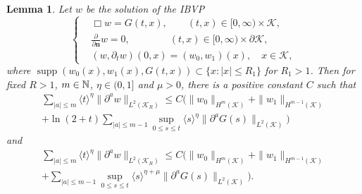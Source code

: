 \documentclass[11pt,twoside]{article}
\def\cK{\mathcal K}
\def\N{\mathop{\mathbb N\kern 0pt}\nolimits}
\def\supp{\mathop{\rm supp}\nolimits}
\def\p{\partial}
\def\supp{\operatorname{supp}}
\def\bn{\mathbf{n}}
\newcommand{\w}[1]{\langle {#1} \rangle}
\theoremstyle{plain}
\newtheorem{lemma}[theorem]{Lemma}
\theoremstyle{definition}
\numberwithin{equation}{section}
\begin{document}
\begin{lemma}
Let $w$ be the solution of the IBVP
\begin{equation}\label{loc:decay:eqn}
\left\{
\begin{aligned}
&\Box w=G(t,x),\qquad (t,x)\in[0,\infty)\times\cK,\\
&\frac{\p}{\p\bn}w=0,\qquad\qquad (t,x)\in[0,\infty)\times\p\cK,\\
&(w,\p_tw)(0,x)=(w_0,w_1)(x),\quad x\in\cK,
\end{aligned}
\right.
\end{equation}
where $\supp(w_0(x),w_1(x),G(t,x))\subset\{x: |x|\le R_1\}$ for $R_1>1$.
Then for fixed $R>1$, $m\in\N$, $\eta\in(0,1]$ and $\mu>0$, there is a positive constant $C$ such that
\begin{equation}\label{loc:decay}
\begin{split}
\sum_{|a|\le m}\w{t}^{\eta}\|\p^aw\|_{L^2(\cK_R)}
\le C(\|w_0\|_{H^{m}(\cK)}+\|w_1\|_{H^{m-1}(\cK)}\\
+\ln(2+t)\sum_{|a|\le m-1}\sup_{0\le s\le t}\w{s}^{\eta}\|\p^aG(s)\|_{L^2(\cK)})
\end{split}
\end{equation}
and
\begin{equation}\label{loc:decay+}
\begin{split}
\sum_{|a|\le m}\w{t}^{\eta}\|\p^aw\|_{L^2(\cK_R)}
\le C(\|w_0\|_{H^{m}(\cK)}+\|w_1\|_{H^{m-1}(\cK)}\\
+\sum_{|a|\le m-1}\sup_{0\le s\le t}\w{s}^{\eta+\mu}\|\p^aG(s)\|_{L^2(\cK)}).
\end{split}
\end{equation}
\end{lemma}
\end{document}
